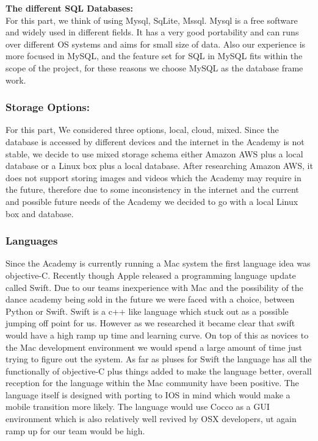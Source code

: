 \textbf{The different SQL Databases:}\\
For this part, we think of using Mysql, SqLite, Mssql. Mysql is a free software and widely used in different fields. It has a very good portability and can runs over different OS systems and aims for small size of data. Also our experience is more focused in MySQL, and the feature set for SQL in MySQL fits within the scope of the project, for these reasons we choose MySQL as the database frame work.

\subsubsection{Storage Options:}
For this part, We considered three options, local, cloud, mixed. Since the database is accessed by different devices and the internet in the Academy is not stable, we decide to use mixed storage schema either Amazon AWS plus a local database or a Linux box plus a local database. After researching Amazon AWS, it does not support storing images and videos which the Academy may require in the future, therefore   due to some inconsistency in the internet and the current and possible future needs of the Academy we decided to go with a local Linux box and database.\\

\subsubsection{Languages}
Since the Academy is currently running a Mac system the first language idea was objective-C. Recently though Apple released a programming language update called Swift. Due to our teams inexperience with Mac and the possibility of the dance academy being sold in the future we were faced with a choice, between Python or Swift. Swift is a c++ like language which stuck out as a possible jumping off point for us. However as we researched it became clear that swift would have a high ramp up time and learning curve. On top of this as novices to the Mac development environment we would spend a large amount of time just trying to figure out the system. As far as pluses for Swift the language has all the functionally of objective-C plus things added to make the language better, overall reception for the language within the Mac community have been positive. The language itself is designed with porting to IOS in mind which would make a mobile transition more likely. The language would use Cocco as a GUI environment which is also relatively well revived by OSX developers, ut again ramp up for our team would be high.

